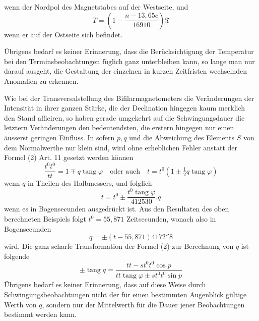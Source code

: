 wenn der Nordpol des Magnetstabes auf der Westseite, und
\[
T=(1-\frac{n-13{,}65c}{16910})\mathfrak{T}
\]
wenn er auf der Ostseite sich befindet.

Übrigens bedarf es keiner Erinnerung, dass die Berücksichtigung der Temperatur bei den Terminsbeobachtungen füglich ganz unterbleiben kann, so lange man nur darauf ausgeht, die Gestaltung der einzelnen in kurzen Zeitfristen wechselnden Anomalien zu erkennen.

Wie bei der Transversalstellung des Bifilarmagnetometers die Veränderungen der Intensität in ihrer ganzen Stärke, die der Declination hingegen kaum merklich den Stand afficiren, so haben gerade umgekehrt auf die Schwingungsdauer die letztern Veränderungen den bedeutendsten, die erstern hingegen nur einen äusserst geringen Einfluss. In sofern $p,q$ und die Abweichung des Elements $S$ von dem Normalwerthe nur klein sind, wird ohne erheblichen Fehler anstatt der Formel (2) Art. 11 gesetzt werden können
\[
\frac{t^0t^0}{tt}=1\mp q\operatorname{tang}\varphi\quad\text{oder auch}\quad t=t^0(1\pm\tfrac12q\operatorname{tang}\varphi)
\]
wenn $q$ in Theilen des Halbmessers, und folglich
\[
t=t^0\pm\frac{t^0\operatorname{tang}\varphi}{412530}.q
\]
wenn es in Bogensecunden ausgedrückt ist. Aus den Resultaten des oben berechneten Beispiels folgt $t^0=55{,}871$ Zeitsecunden, wonach also in Bogensecunden
\[
q=\pm(t-55{,}871)4172''8
\]
wird. Die ganz scharfe Transformation der Formel (2) zur Berechnung von $q$ ist folgende
\[
\pm\operatorname{tang}q=\frac{tt-st^0t^0\cos p}{tt\operatorname{tang}\varphi\pm st^0t^0\sin p}
\]
Übrigens bedarf es keiner Erinnerung, dass auf diese Weise durch Schwin\-gungsbeobachtungen nicht der für einen bestimmten Augenblick gültige Werth von $q$, sondern nur der Mittelwerth für die Dauer jener Beobachtungen bestimmt werden kann.


